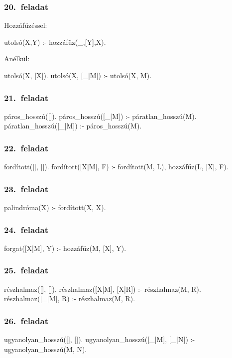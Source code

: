 \subsubsection*{20.~feladat}
Hozzáfűzéssel:
\begin{program}
utolsó(X,Y) :- hozzáfűz(_,[Y],X).
\end{program}
Anélkül:
\begin{program}
utolsó(X, [X]). 
utolsó(X, [_|M]) :- utolsó(X, M). 
\end{program}
\subsubsection*{21.~feladat}
\begin{program}
páros_hosszú([]). 
páros_hosszú([_|M]) :- páratlan_hosszú(M). 
páratlan_hosszú([_|M]) :- páros_hosszú(M). 
\end{program}
\subsubsection*{22.~feladat}
\begin{program}
fordított([], []). 
fordított([X|M], F) :-
    fordított(M, L), hozzáfűz(L, [X], F).
\end{program}
\subsubsection*{23.~feladat}
\begin{program}
palindróma(X) :- fordított(X, X).
\end{program}
\subsubsection*{24.~feladat}
\begin{program}
forgat([X|M], Y) :- hozzáfűz(M, [X], Y). 
\end{program}
\subsubsection*{25.~feladat}
\begin{program}
részhalmaz([], []).
részhalmaz([X|M], [X|R]) :- részhalmaz(M, R).
részhalmaz([_|M], R) :- részhalmaz(M, R).
\end{program}
\subsubsection*{26.~feladat}
\begin{program}
ugyanolyan_hosszú([], []). 
ugyanolyan_hosszú([_|M], [_|N]) :-
    ugyanolyan_hosszú(M, N). 
\end{program}
